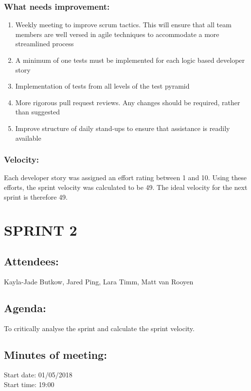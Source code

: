 \documentclass[10pt,onecolumn]{witseiepaper}
\begin{document}
\subsubsection*{What needs improvement:}
\begin{enumerate}
	\item Weekly meeting to improve scrum tactics. This will ensure that all team members are well versed in agile techniques to accommodate a more streamlined process
	\item A minimum of one tests must be implemented for each logic based developer story 
	\item Implementation of tests from all levels of the test pyramid
	\item More rigorous pull request reviews. Any changes should be required, rather than suggested
	\item Improve structure of daily stand-ups to ensure that assistance is readily available 
\end{enumerate}

\subsubsection*{Velocity:}
Each developer story was assigned an effort rating between 1 and 10. Using these efforts, the sprint velocity was calculated to be 49. The ideal velocity for the next sprint is therefore 49.
\newpage
\section*{SPRINT 2}
\subsection*{Attendees:}
Kayla-Jade Butkow, Jared Ping, Lara Timm, Matt van Rooyen

\subsection*{Agenda:} 
To critically analyse the sprint and calculate the sprint velocity.

\subsection*{Minutes of meeting:}
Start date: 01/05/2018 \\
Start time: 19:00
\end{document}
